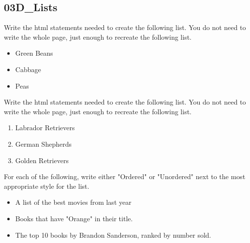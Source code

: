 \documentclass[letterpaper,12pt]{exam}
\begin{document}
\begin{questions}
\begin{samepage}
\section*{03D\_Lists}
\question Write the html statements needed to create the following list.  You do not need to write the whole page, just enough to recreate the following list.
\begin{itemize}
\item Green Beans
\item Cabbage
\item Peas
\vspace{20mm}
\end{itemize} 
\end{samepage}

\begin{samepage}
\question Write the html statements needed to create the following list.  You do not need to write the whole page, just enough to recreate the following list. 
\begin{enumerate}
\item Labrador Retrievers
\item German Shepherds
\item Golden Retrievers
\end{enumerate}
\vspace{20mm}
\end{samepage}

\begin{samepage}
\question For each of the following, write either "Ordered" or "Unordered" next to the most appropriate style for the list. 

\begin{itemize}
\item
\vspace{5mm} \blank\blank A list of the best movies from last year
\item
\vspace{5mm} \blank\blank Books that have "Orange" in their title.
\item
\vspace{5mm} \blank\blank The top 10 books by Brandon Sanderson, ranked by number sold.
\end{itemize}
\end{samepage}


\end{questions}
\end{document}
